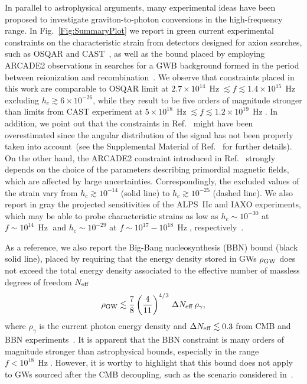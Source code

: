\documentclass[twocolumn,superscriptaddress,floatfix,preprintnumbers, nofootinbib,hyperref]{revtex4-2}
\DeclareMathOperator{\Hz}{Hz}
\begin{document}
In parallel to astrophysical arguments, many experimental ideas have been proposed to investigate graviton-to-photon conversions in the high-frequency range.
In Fig.~\ref{Fig:SummaryPlot} we report in green current experimental constraints on the characteristic strain from detectors designed for axion searches, such as OSQAR and CAST~\cite{Ejlli:2019bqj}, as well as the bound placed by employing ARCADE2 observations in searches for a GWB background formed in the period between reionization and recombination~\cite{Domcke:2020yzq}. We observe that constraints placed in this work are comparable to OSQAR limit at $2.7\times10^{14}\,\Hz\lesssim f\lesssim1.4\times10^{15}\,\Hz$ excluding $h_c\gtrsim6\times10^{-26}$, while they result to be five orders of magnitude stronger than limits from CAST experiment at $5\times10^{18}\,\Hz\lesssim f\lesssim1.2\times10^{19}\,\Hz$. In addition, we point out that the constraints in Ref.~\cite{Ejlli:2019bqj} might have been overestimated since the angular distribution of the signal has not been properly taken into account~(see the Supplemental Material of Ref.~\cite{Liu:2023mll} for further details). On the other hand, the ARCADE2 constraint introduced in Ref.~\cite{Domcke:2020yzq} strongly depends on the choice of the parameters describing primordial magnetic fields, which are affected by large uncertainties. Correspondingly, the excluded values of the strain vary from $h_c\gtrsim 10^{-14}$ (solid line) to $h_c\gtrsim 10^{-25}$ (dashed line). We also report in gray the projected sensitivities of the ALPS~IIc and IAXO experiments, which may be able to probe characteristic strains as low as $h_c\sim10^{-30}$ at $f\sim10^{14}\,\Hz$ and $h_c\sim10^{-29}$ at $f\sim10^{17}-10^{18}\,\Hz$, respectively~\cite{Ejlli:2019bqj}.

As a reference, we also report the Big-Bang nucleosynthesis (BBN) bound (black solid line), placed by requiring that the energy density stored in GWs $\rho_{\rm GW}$ does not exceed the total energy density associated to the effective number of massless degrees of freedom $N_{\rm eff}$~\cite{Pagano:2015hma}
\begin{equation}
    \rho_{\rm GW}\lesssim\frac{7}{8}\left(\frac{4}{11}\right)^{{4}/{3}}\,\Delta N_{\rm eff}\,\rho_{\gamma},
\end{equation}
where $\rho_{\gamma}$ is the current photon energy density and $\Delta N_{\rm eff}\lesssim0.3$ from CMB and BBN experiments~\cite{Planck:2018vyg,Cyburt:2015mya}. It is apparent that the BBN constraint is many orders of magnitude stronger than astrophysical bounds, especially in the range $f<10^{18}\,\Hz$. However, it is worthy to highlight that this bound does not apply to GWs sourced after the CMB decoupling, such as the scenario considered in~\cite{Domcke:2020yzq}. 
\end{document}
